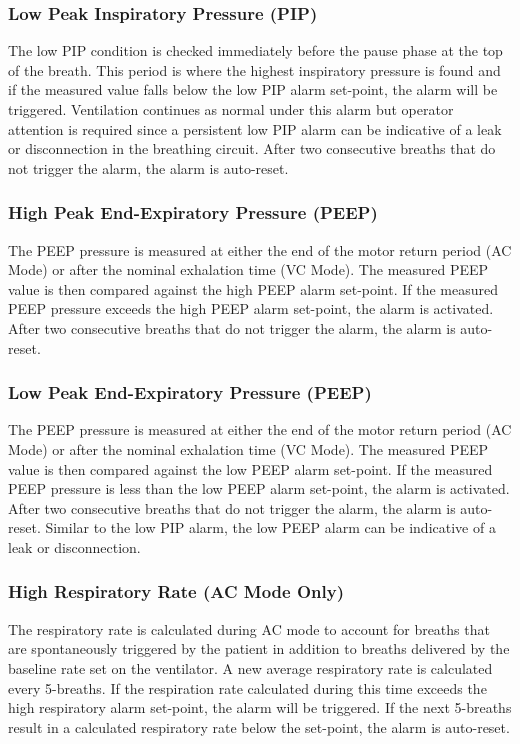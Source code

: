 \documentclass[]{article}
\begin{document}
\subsubsection{Low Peak Inspiratory Pressure (PIP)}
The low PIP condition is checked immediately before the pause phase at the top of the breath.  This period is where the highest inspiratory pressure is found and if the measured value falls below the low PIP alarm set-point, the alarm will be triggered.  Ventilation continues as normal under this alarm but operator attention is required since a persistent low PIP alarm can be indicative of a leak or disconnection in the breathing circuit. After two consecutive breaths that do not trigger the alarm, the alarm is auto-reset.

\subsubsection{High Peak End-Expiratory Pressure (PEEP)}
The PEEP pressure is measured at either the end of the motor return period (AC Mode) or after the nominal exhalation time (VC Mode).  The measured PEEP value is then compared against the high PEEP alarm set-point.  If the measured PEEP pressure exceeds the high PEEP alarm set-point, the alarm is activated. After two consecutive breaths that do not trigger the alarm, the alarm is auto-reset.

\subsubsection{Low Peak End-Expiratory Pressure (PEEP)}
The PEEP pressure is measured at either the end of the motor return period (AC Mode) or after the nominal exhalation time (VC Mode).  The measured PEEP value is then compared against the low PEEP alarm set-point.  If the measured PEEP pressure is less than the low PEEP alarm set-point, the alarm is activated. After two consecutive breaths that do not trigger the alarm, the alarm is auto-reset.  Similar to the low PIP alarm, the low PEEP alarm can be indicative of a leak or disconnection.

\subsubsection{High Respiratory Rate (AC Mode Only)}
The respiratory rate is calculated during AC mode to account for breaths that are spontaneously triggered by the patient in addition to breaths delivered by the baseline rate set on the ventilator.  A new average respiratory rate is calculated every 5-breaths.  If the respiration rate calculated during this time exceeds the high respiratory alarm set-point, the alarm will be triggered.  If the next 5-breaths result in a calculated respiratory rate below the set-point, the alarm is auto-reset. 
\end{document}
